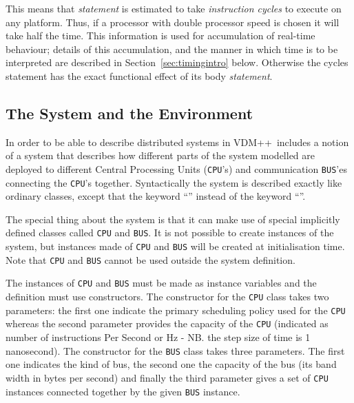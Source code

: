 \documentclass{overturerepchap}
\newcommand{\keyw}[1]{{\bf\ttfamily{#1}}}
\newcommand{\vdmpp}{VDM++} %
\begin{document}
This means that \emph{statement} is estimated to take
\emph{instruction cycles} to execute on any platform. Thus, if a
processor with double processor speed is chosen it will take half the
time. This information is used for accumulation of real-time
behaviour; details of this accumulation, and the manner in which time
is to be interpreted are described in Section~\ref{sec:timingintro}
below.  Otherwise the cycles statement has the exact functional
effect of its body \textit{statement}.

\subsection{The System and the Environment}

In order to be able to describe distributed systems in \vdmpp\
includes a notion of a system that describes how different parts of
the system modelled are deployed to different Central Processing Units
(\texttt{CPU}'s) and communication \texttt{BUS}'es 
connecting the \texttt{CPU}'s
together. Syntactically the system is described exactly like ordinary
classes, except that the keyword ``\keyw{system}'' instead of the
keyword ``\keyw{class}''.

The special thing about the system is that it can make use of special
implicitly defined classes called \texttt{CPU} and \texttt{BUS}. It is 
not possible to create instances of the system, but instances made of
\texttt{CPU} and \texttt{BUS} will be created at initialisation time. 
Note that \texttt{CPU} and \texttt{BUS} cannot be used outside the
system definition.

The instances of \texttt{CPU} and \texttt{BUS} must be made as instance 
variables and the definition must use constructors. The constructor for the
\texttt{CPU} class takes two parameters: the first one indicate the 
primary scheduling policy used for the \texttt{CPU} whereas the second 
parameter provides the capacity of the \texttt{CPU} (indicated as number of 
instructions Per Second or Hz - NB. the step size of time is 1 nanosecond). 
The constructor for the \texttt{BUS}
class takes three parameters. The first one indicates the kind of bus, the
second one the capacity of the bus (its band width in bytes per second) and finally the third 
parameter gives a set of \texttt{CPU} instances connected together by the
given \texttt{BUS} instance.
\end{document}
